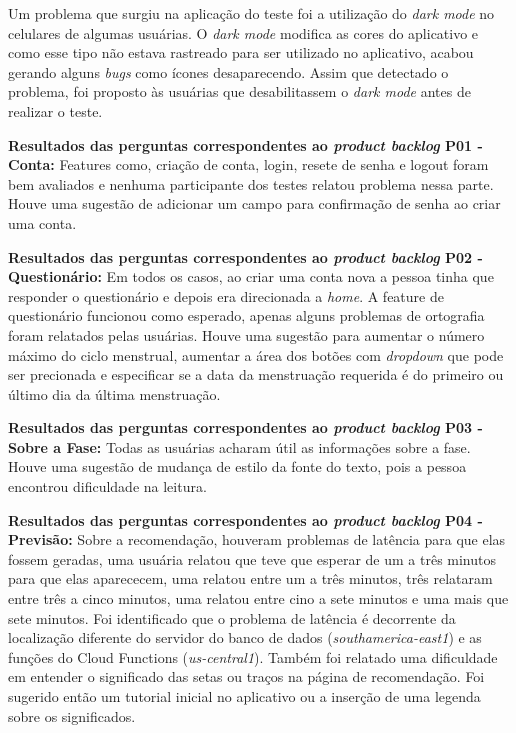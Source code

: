 Um problema que surgiu na aplicação do teste foi a utilização do \emph{dark mode} no celulares de algumas usuárias. O \emph{dark mode} 
modifica as cores do aplicativo e como esse tipo não estava rastreado para ser utilizado no aplicativo, acabou gerando alguns \emph{bugs} 
como ícones desaparecendo. Assim que detectado o problema, foi proposto às usuárias que desabilitassem o \emph{dark mode} antes de realizar o teste.

\textbf{Resultados das perguntas correspondentes ao \emph{product backlog} P01 - Conta:} Features como, criação de conta, login, resete de 
senha e logout foram bem avaliados e nenhuma participante dos testes relatou problema nessa parte. 
Houve uma sugestão de adicionar um campo para confirmação de senha ao criar uma conta.


\textbf{Resultados das perguntas correspondentes ao \emph{product backlog} P02 - Questionário:} Em todos os casos, ao criar uma conta nova a pessoa tinha que responder o 
questionário e depois era direcionada a \emph{home}. A feature de questionário 
funcionou como esperado, apenas alguns problemas de ortografia foram relatados pelas usuárias. Houve uma sugestão para aumentar o 
número máximo do ciclo menstrual, aumentar a área dos botões com \emph{dropdown} que pode ser precionada e especificar se a 
data da menstruação requerida é do 
primeiro ou último dia da última menstruação.

\textbf{Resultados das perguntas correspondentes ao \emph{product backlog} P03 - Sobre a Fase:} Todas as usuárias acharam útil as informações 
sobre a fase. Houve uma sugestão de mudança de estilo da fonte do texto, pois a pessoa encontrou dificuldade na leitura.


\textbf{Resultados das perguntas correspondentes ao \emph{product backlog} P04 - Previsão:} Sobre a recomendação, houveram 
problemas de latência para que elas fossem geradas, uma usuária relatou que teve que esperar de um a três 
minutos para que elas aparececem, uma relatou entre um a três minutos, três relataram entre três a cinco minutos, uma 
relatou entre cino a sete minutos e uma mais que sete minutos. Foi identificado que o problema de latência é 
decorrente da localização diferente do servidor do banco de dados (\emph{southamerica-east1}) e as 
funções do Cloud Functions (\emph{us-central1}). Também foi relatado 
uma dificuldade em entender o significado das setas ou traços na página de recomendação. Foi sugerido 
então um tutorial inicial no aplicativo ou a inserção de uma legenda sobre os significados.

